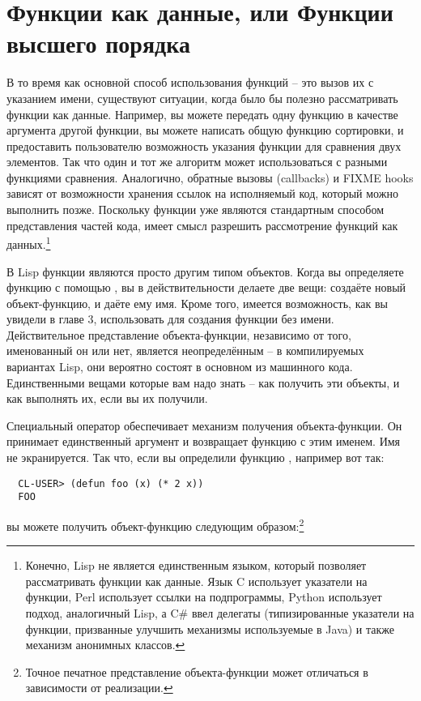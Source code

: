 \section{Функции как данные, или Функции высшего порядка}

В то время как основной способ использования функций -- это вызов их с указанием имени,
существуют ситуации, когда было бы полезно рассматривать функции как данные.  Например, вы
можете передать одну функцию в качестве аргумента другой функции, вы можете написать общую
функцию сортировки, и предоставить пользователю возможность указания функции для сравнения
двух элементов.  Так что один и тот же алгоритм может использоваться с разными функциями
сравнения.  Аналогично, обратные вызовы (callbacks) и FIXME hooks зависят от возможности
хранения ссылок на исполняемый код, который можно выполнить позже.  Поскольку функции уже
являются стандартным способом представления частей кода, имеет смысл разрешить
рассмотрение функций как данных.\footnote{Конечно, Lisp не является единственным языком,
  который позволяет рассматривать функции как данные.  Язык C использует указатели на
  функции, Perl использует ссылки на подпрограммы, Python использует подход, аналогичный
  Lisp, а C\# ввел делегаты (типизированные указатели на функции, призванные улучшить
  механизмы используемые в Java) и также механизм анонимных классов.}

В Lisp функции являются просто другим типом объектов.  Когда вы определяете функцию с
помощью , вы в действительности делаете две вещи: создаёте новый
объект-функцию, и даёте ему имя.  Кроме того, имеется возможность, как вы увидели в главе
3, использовать  для создания функции без имени.  Действительное
представление объекта-функции, независимо от того, именованный он или нет, является
неопределённым -- в компилируемых вариантах Lisp, они вероятно состоят в основном из
машинного кода.  Единственными вещами которые вам надо знать -- как получить эти объекты,
и как выполнять их, если вы их получили.

Специальный оператор  обеспечивает механизм получения объекта-функции.  Он
принимает единственный аргумент и возвращает функцию с этим именем.  Имя не экранируется.
Так что, если вы определили функцию , например вот так:

\begin{verbatim}
  CL-USER> (defun foo (x) (* 2 x))
  FOO
\end{verbatim}

вы можете получить объект-функцию следующим образом:\footnote{Точное печатное
  представление объекта-функции может отличаться в зависимости от реализации.}

